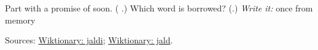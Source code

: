 \begin{tcolorbox}[breakable,colback=teal!4,colframe=teal!35!black,title={Before you move on}]
Part with a promise of soon. (\textbf{ }.) Which word is borrowed? (\textbf{}.) \emph{Write it:} \textbf{} once from memory

Sources: \href{https://en.wiktionary.org/wiki/\%E0\%A8\%9C\%E0\%A8\%B2\%E0\%A8\%A6\%E0\%A9\%80}{Wiktionary: jaldi}; \href{https://en.wiktionary.org/wiki/\%D8\%AC\%D9\%84\%D8\%AF}{Wiktionary: jald}.
\end{tcolorbox}
